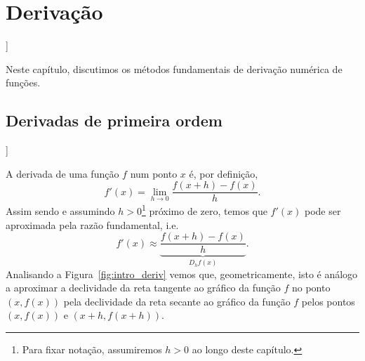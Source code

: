 
\chapter{Derivação}\label{cap_deriv}
\thispagestyle{fancy}

\begin{flushleft}
  [[tag:revisar]]
\end{flushleft}

Neste capítulo, discutimos os métodos fundamentais de derivação numérica de funções.

\section{Derivadas de primeira ordem}\label{cap_deriv_sec_df}

\begin{flushleft}
  [[tag:revisar]]
\end{flushleft}

A derivada de uma função $f$ num ponto $x$ é, por definição,
\begin{equation}
  f'(x) = \lim_{h\to 0} \frac{f(x+h) - f(x)}{h}.
\end{equation}
Assim sendo e assumindo $h>0$\footnote{Para fixar notação, assumiremos $h>0$ ao longo deste capítulo.} próximo de zero, temos que $f'(x)$ pode ser aproximada pela razão fundamental, i.e.
\begin{equation}\label{eq_razao_fundamental}
  f'(x) \approx \underbrace{\frac{f(x+h) - f(x)}{h}}_{D_hf(x)}.
\end{equation}
Analisando a Figura~\ref{fig:intro_deriv} vemos que, geometricamente, isto é análogo a aproximar a declividade da reta tangente ao gráfico da função $f$ no ponto $(x,f(x))$ pela declividade da reta secante ao gráfico da função $f$ pelos pontos $(x,f(x))$ e $(x+h,f(x+h))$.

